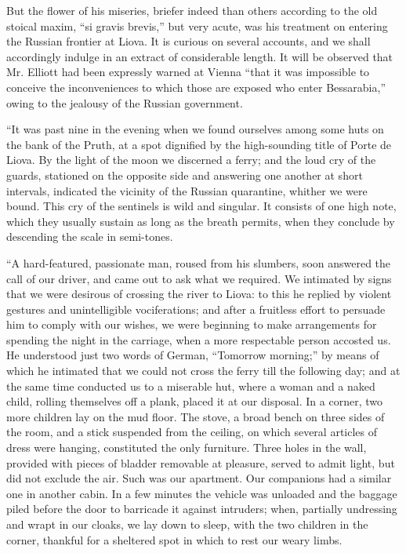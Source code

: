But the
flower of his miseries, briefer indeed than others according to the old
stoical maxim, ``si gravis brevis,'' but very acute, was his treatment on
entering the Russian frontier at Liova. It is curious on several
accounts, and we shall accordingly indulge in an extract of considerable
length. It will be observed that Mr. Elliott had been expressly warned
at Vienna ``that it was impossible to conceive the inconveniences to
which those are exposed who enter Bessarabia,'' owing to the jealousy of
the Russian government.

``It
was past nine in the evening when we found ourselves among some huts on
the bank of the Pruth, at a spot dignified by the high-sounding title of
Porte de Liova. By the light of the moon we discerned a ferry; and the
loud cry of the guards, stationed on the opposite side and answering one
another at short intervals, indicated the vicinity of the Russian
quarantine, whither we were bound. This cry of the sentinels is wild and
singular. It consists of one high note, which they usually sustain as
long as the breath permits, when they conclude by descending the scale
in semi-tones.

``A
hard-featured, passionate man, roused from his slumbers, soon answered
the call of our driver, and came out to ask what we required. We
intimated by signs that we were desirous of crossing the river to Liova:
to this he replied by violent gestures and unintelligible vociferations;
and after a fruitless effort to persuade him to comply with our
wishes, we were beginning to make arrangements for
spending the night in the carriage, when a more respectable person
accosted us. He understood just two words of German, ``Tomorrow morning;''
by means of which he intimated that we could not cross the ferry till
the following day; and at the same time conducted us to a miserable hut,
where a woman and a naked child, rolling themselves off a plank, placed
it at our disposal. In a corner, two more children lay on the mud floor.
The stove, a broad bench on three sides of the room, and a stick
suspended from the ceiling, on which several articles of dress were
hanging, constituted the only furniture. Three holes in the wall,
provided with pieces of bladder removable at pleasure, served to admit
light, but did not exclude the air. Such was our apartment. Our
companions had a similar one in another cabin. In a few minutes the
vehicle was unloaded and the baggage piled before the door to barricade
it against intruders; when, partially undressing and wrapt in our
cloaks, we lay down to sleep, with the two children in the corner,
thankful for a sheltered spot in which to rest our weary limbs.


